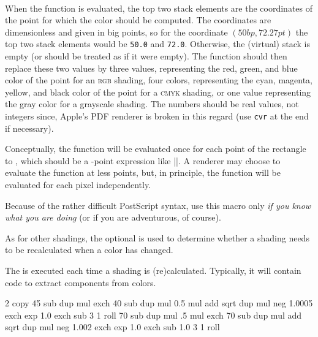 \begin{command}{\pgfdeclarefunctionalshading{}\\
}
    When the function is evaluated, the top two stack elements are the
    coordinates of the point for which the color should be computed. The
    coordinates are dimensionless and given in big points, so for the
    coordinate $(50bp, 72.27pt)$ the top two stack elements would be
    \texttt{50.0} and \texttt{72.0}. Otherwise, the (virtual) stack is empty
    (or should be treated as if it were empty). The function should then
    replace these two values by three values, representing the red, green, and
    blue color of the point for an \textsc{rgb} shading, four colors,
    representing the cyan, magenta, yellow, and black color of the point for a
    \textsc{cmyk} shading, or one value representing the gray color for a
    grayscale shading. The numbers should be real values, not integers
    since, Apple's PDF renderer is broken in this regard (use \texttt{cvr} at
    the end if necessary).

    Conceptually, the function will be evaluated once for each point of the
    rectangle  to , which
    should be a \pgfname-point expression like |\pgfpoint{100bp}{100bp}|. A
    renderer may choose to evaluate the function at less points, but, in
    principle, the function will be evaluated for each pixel independently.

    Because of the rather difficult PostScript syntax, use this macro only
    \emph{if you know what you are doing} (or if you are adventurous, of
    course).

    As for other shadings, the optional  is used to determine
    whether a shading needs to be recalculated when a color has changed.

    The  is executed each time a shading is (re)calculated.
    Typically, it will contain code to extract components from colors.
\begin{codeexample}[]
    {\pgfpointorigin}{\pgfpoint{4cm}{4cm}}{}{
  2 copy
  45 sub dup mul exch
  40 sub dup mul 0.5 mul add sqrt
  dup mul neg 1.0005 exch exp 1.0 exch sub
  3 1 roll
  70 sub dup mul .5 mul exch
  70 sub dup mul add sqrt
  dup mul neg 1.002 exch exp 1.0 exch sub
  1.0 3 1 roll
}
\end{codeexample}


\end{command}
